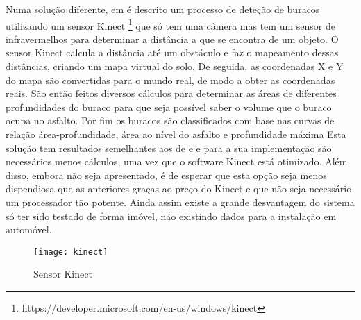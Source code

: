 Numa solução diferente, em \cite{Moazzam2013} é descrito um processo de deteção de buracos utilizando um sensor Kinect \footnote{https://developer.microsoft.com/en-us/windows/kinect} que só tem uma câmera mas tem um sensor de infravermelhos para determinar a distância a que se encontra de um objeto.
O sensor Kinect calcula a distância até um obstáculo e faz o mapeamento dessas distâncias, criando um mapa virtual do solo.
De seguida, as coordenadas X e Y do mapa são convertidas para o mundo real, de modo a obter as coordenadas reais.
São então feitos diversos cálculos para determinar as áreas de diferentes profundidades do buraco para que seja possível saber o volume que o buraco ocupa no asfalto.
Por fim os buracos são classificados com base nas curvas de relação área-profundidade, área ao nível do asfalto e profundidade máxima
Esta solução tem resultados semelhantes aos de \cite{Zhang} e \cite{Chan2014} e para a sua implementação são necessários menos cálculos, uma vez que o software Kinect está otimizado.
Além disso, embora não seja apresentado, é de esperar que esta opção seja menos dispendiosa que as anteriores graças ao preço do Kinect e que não seja necessário um processador tão potente.
Ainda assim existe a grande desvantagem do sistema só ter sido testado de forma imóvel, não existindo dados para a instalação em automóvel.

\begin{figure}[htbp]
	\centering
	\texttt{[image: kinect]}
	\caption[Sensor Kinect]{Sensor Kinect \footnotemark}
	\label{fig:sensor_kinect}
\end{figure}


